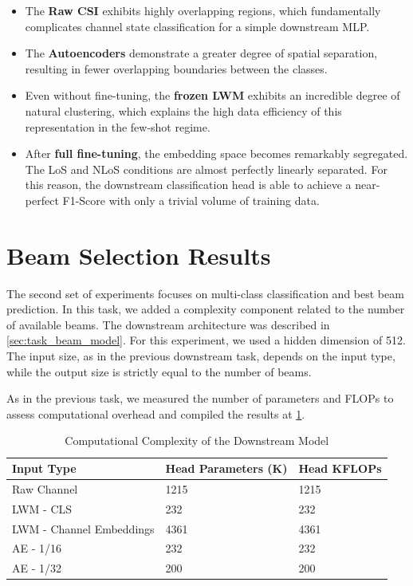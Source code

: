 \begin{itemize}
    \item The \textbf{Raw CSI} exhibits highly overlapping regions, which fundamentally complicates channel state classification for a simple downstream MLP.
    \item The \textbf{Autoencoders} demonstrate a greater degree of spatial separation, resulting in fewer overlapping boundaries between the classes.
    \item Even without fine-tuning, the \textbf{frozen LWM} exhibits an incredible degree of natural clustering, which explains the high data efficiency of this representation in the few-shot regime.
    \item After \textbf{full fine-tuning}, the embedding space becomes remarkably segregated. The LoS and NLoS conditions are almost perfectly linearly separated. For this reason, the downstream classification head is able to achieve a near-perfect F1-Score with only a trivial volume of training data.
\end{itemize}

\section{Beam Selection Results}\label{sec:experiments_beam}

The second set of experiments focuses on multi-class classification and best beam prediction. In this task, we added a complexity component related to the number of available beams. The downstream architecture was described in \ref{sec:task_beam_model}. For this experiment, we used a hidden dimension of 512. The input size, as in the previous downstream task, depends on the input type, while the output size is strictly equal to the number of beams.


As in the previous task, we measured the number of parameters and FLOPs to assess computational overhead and compiled the results at \ref{tab:beam_selection_model_complexity}.

\begin{table}[htbp]
    \centering
    \caption{Computational Complexity of the Downstream Model}
    \label{tab:beam_selection_model_complexity}
    \begin{tabular}{lll}
        \hline
        \textbf{Input Type} & \textbf{Head Parameters (K)} & \textbf{Head KFLOPs} \\
        \hline
        Raw Channel & 1215 & 1215 \\
        LWM - CLS & 232  & 232 \\
        LWM - Channel Embeddings & 4361 & 4361  \\
        AE - 1/16 & 232 & 232 \\
        AE - 1/32 & 200 & 200 \\
        \hline
    \end{tabular}
\end{table}

